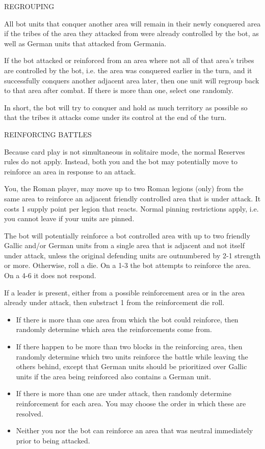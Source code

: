 \label{solitaire:regrouping}REGROUPING

All bot units that conquer another area will remain in their newly conquered area if the tribes of the area they attacked from were already controlled by the bot, as well as German units that attacked from Germania.
    
If the bot attacked or reinforced from an area where not all of that area's tribes are controlled by the bot, i.e. the area was conquered earlier in the turn, and it successfully conquers another adjacent area later, then one unit will regroup back to that area after combat. If there is more than one, select one randomly.
    
In short, the bot will try to conquer and hold as much territory as possible so that the tribes it attacks come under its control at the end of the turn.
  
\label{solitaire:reinforcing_battles}REINFORCING BATTLES
  
Because card play is not simultaneous in solitaire mode, the normal Reserves rules do not apply. Instead, both you and the bot may potentially move to reinforce an area in response to an attack.
  
You, the Roman player, may move up to two Roman legions (only) from the same area to reinforce an adjacent friendly controlled area that is under attack. It costs 1 supply point per legion that reacts. Normal pinning restrictions apply, i.e. you cannot leave if your units are pinned.
    
The bot will potentially reinforce a bot controlled area with up to two friendly Gallic and/or German units from a single area that is adjacent and not itself under attack, unless the original defending units are outnumbered by 2-1 strength or more. Otherwise, roll a die. On a 1-3 the bot attempts to reinforce the area. On a 4-6 it does not respond.

If a leader is present, either from a possible reinforcement area or in the area already under attack, then substract 1 from the reinforcement die roll.

\begin{itemize}
  \item If there is more than one area from which the bot could reinforce, then randomly determine which area the reinforcements come from.
    
  \item If there happen to be more than two blocks in the reinforcing area, then randomly determine which two units reinforce the battle while leaving the others behind, except that German units should be prioritized over Gallic units if the area being reinforced also contains a German unit.
    
  \item If there is more than one are under attack, then randomly determine reinforcement for each area. You may choose the order in which these are resolved.
    
  \item Neither you nor the bot can reinforce an area that was neutral immediately prior to being attacked.
\end{itemize}
  
